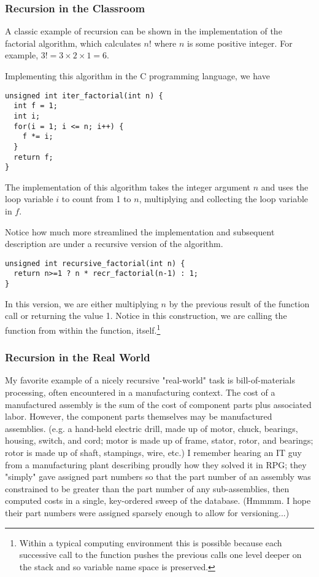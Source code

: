 \documentclass[jou,apacite]{apa6}
\begin{document}
\subsubsection{Recursion in the Classroom}   %
A classic example of recursion can be shown in the implementation of the factorial algorithm, which calculates $n!$ where $n$ is some positive integer.  For example, $3! = 3\times2\times1 = 6$.

Implementing this algorithm in the C programming language, we have
\begin{verbatim}
unsigned int iter_factorial(int n) {
  int f = 1;
  int i;
  for(i = 1; i <= n; i++) {
    f *= i;
  }
  return f;
}
\end{verbatim}
The implementation of this algorithm takes the integer argument $n$ and uses the loop variable $i$ to count from 1 to $n$, multiplying and collecting the loop variable in $f$.

Notice how much more streamlined the implementation and subsequent description are under a recursive version of the algorithm.
\begin{verbatim}
unsigned int recursive_factorial(int n) {
  return n>=1 ? n * recr_factorial(n-1) : 1;
}
\end{verbatim}
In this version, we are either multiplying $n$ by the previous result of the function call or returning the value 1.  Notice in this construction, we are calling the function from within the function, itself.\footnote{Within a typical computing environment this is possible because each successive call to the function pushes the previous calls one level deeper on the stack and so variable name space is preserved.}

\subsubsection{Recursion in the Real World}  %

My favorite example of a nicely recursive "real-world" task is bill-of-materials processing, often encountered in a manufacturing context. The cost of a manufactured assembly is the sum of the cost of component parts plus associated labor. However, the component parts themselves may be manufactured assemblies. (e.g. a hand-held electric drill, made up of motor, chuck, bearings, housing, switch, and cord; motor is made up of frame, stator, rotor, and bearings; rotor is made up of shaft, stampings, wire, etc.) I remember hearing an IT guy from a manufacturing plant describing proudly how they solved it in RPG; they "simply" gave assigned part numbers so that the part number of an assembly was constrained to be greater than the part number of any sub-assemblies, then computed costs in a single, key-ordered sweep of the database. (Hmmmm. I hope their part numbers were assigned sparsely enough to allow for versioning...)
\end{document}
